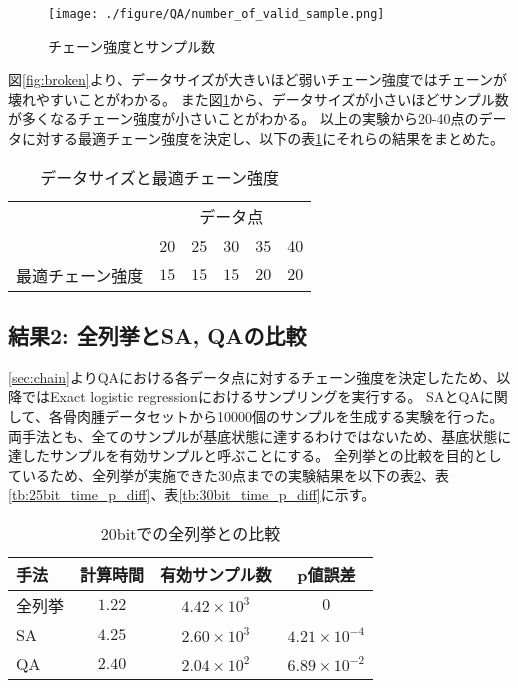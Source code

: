 \documentclass[12pt, dvipdfmx]{jmaster}
\theoremstyle{definition}
\begin{document}
\begin{figure}[H]
	\begin{center}
		\texttt{[image: ./figure/QA/number\_of\_valid\_sample.png]}
	\end{center}
	\caption{チェーン強度とサンプル数}
	\label{fig:chain_num_sample}
\end{figure}

図\ref{fig:broken}より、データサイズが大きいほど弱いチェーン強度ではチェーンが壊れやすいことがわかる。
また図\ref{fig:chain_num_sample}から、データサイズが小さいほどサンプル数が多くなるチェーン強度が小さいことがわかる。
以上の実験から20-40点のデータに対する最適チェーン強度を決定し、以下の表\ref{tb:chain_strength_datasize}にそれらの結果をまとめた。

\begin{table}[H]
	\caption{データサイズと最適チェーン強度}
	\label{tb:chain_strength_datasize}
	\centering
	\begin{tabular}{lccccc}
	  \hline
	  &\multicolumn{5}{c}{データ点} \\
	  & 20 & 25 & 30 & 35 & 40 \\
	  \hline\hline
	  最適チェーン強度 & $15$ & $15$ & $15$ & $20$ & $20$\\
	  \hline
	\end{tabular}
\end{table}

\subsection{結果2: 全列挙とSA, QAの比較}
\label{sec:time_compare}
\ref{sec:chain}よりQAにおける各データ点に対するチェーン強度を決定したため、以降ではExact logistic regressionにおけるサンプリングを実行する。
SAとQAに関して、各骨肉腫データセットから10000個のサンプルを生成する実験を行った。
両手法とも、全てのサンプルが基底状態に達するわけではないため、基底状態に達したサンプルを有効サンプルと呼ぶことにする。
全列挙との比較を目的としているため、全列挙が実施できた30点までの実験結果を以下の表\ref{tb:20bit_time_p_diff}、表\ref{tb:25bit_time_p_diff}、表\ref{tb:30bit_time_p_diff}に示す。

\begin{table}[H]
	\caption{20bitでの全列挙との比較}
	\label{tb:20bit_time_p_diff}
	\centering
	\begin{tabular}{lccc}
		\hline
		手法& 計算時間 & 有効サンプル数 & p値誤差\\
		\hline\hline
		全列挙&$1.22$ & $4.42 \times 10^3$&$0$\\
		SA  &$4.25$&$2.60 \times 10^3$&$4.21 \times 10^{-4}$\\
		QA &$2.40$&$2.04 \times 10^2$&$6.89 \times 10^{-2}$\\
		\hline
	\end{tabular}
\end{table}
\end{document}
